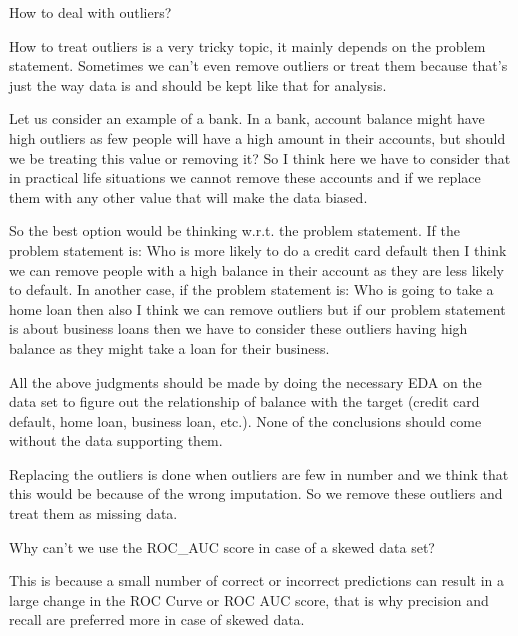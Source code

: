 	\begin{qanda}
		\begin{question}
How to deal with outliers?
		\end{question}

		\begin{answer}
How to treat outliers is a very tricky topic, it mainly depends on the problem statement. Sometimes we can't even remove outliers or treat them because that's just the way data is and should be kept like that for analysis.

Let us consider an example of a bank.  In a bank, account balance might have high outliers as few people will have a high amount in their accounts, but should we be treating this value or removing it? So I think here we have to consider that in practical life situations we cannot remove these accounts and if we replace them with any other value that will make the data biased.

So the best option would be thinking w.r.t. the problem statement. If the problem statement is: Who is more likely to do a credit card default then I think we can remove people with a high balance in their account as they are less likely to default. In another case, if the problem statement is: Who is going to take a home loan then also I think we can remove outliers but if our problem statement is about business loans then we have to consider these outliers having high balance as they might take a loan for their business.

All the above judgments should be made by doing the necessary EDA on the data set to figure out the relationship of balance with the target (credit card default, home loan, business loan, etc.). None of the conclusions should come without the data supporting them.

Replacing the outliers is done when outliers are few in number and we think that this would be because of the wrong imputation. So we remove these outliers and treat them as missing data.
		\end{answer}
	\end{qanda}

	\begin{qanda}
		\begin{question}
Why can't we use the ROC\_AUC score in case of a skewed data set?
		\end{question}

		\begin{answer}
This is because a small number of correct or incorrect predictions can result in a large change in the ROC Curve or ROC AUC score, that is why precision and recall are preferred more in case of skewed data.
		\end{answer}
	\end{qanda}

